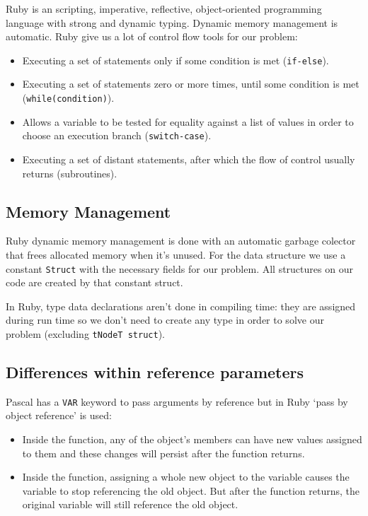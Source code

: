 \documentclass[11pt]{scrartcl} %
\begin{document}
Ruby is an scripting, imperative, reflective, object-oriented programming language with strong and dynamic typing. Dynamic memory management is automatic. Ruby give us a lot of control flow tools for our problem:

\begin{itemize}  
\item Executing a set of statements only if some condition is met (\texttt{if-else}).
\item Executing a set of statements zero or more times, until some condition is met (\texttt{while(condition)}). 
\item Allows a variable to be tested for equality against a list of values in order to choose an execution branch (\texttt{switch-case}).
\item Executing a set of distant statements, after which the flow of control usually returns (subroutines).
\end{itemize}

\subsection*{Memory Management}

Ruby dynamic memory management is done with an automatic garbage colector that frees allocated memory when it's unused. For the data structure we use a constant \texttt{Struct} with the necessary fields for our problem. All structures on our code are created by that constant struct.

In Ruby, type data declarations aren't done in compiling time: they are assigned during run time so we don't need to create any type in order to solve our problem (excluding \texttt{tNodeT struct}).

\subsection*{Differences within reference parameters}

Pascal has a \texttt{VAR} keyword to pass arguments by reference but in Ruby `pass by object reference' is used:

 \begin{itemize}
\item Inside the function, any of the object's members can have new values assigned to them and these changes will persist after the function returns.
\item Inside the function, assigning a whole new object to the variable causes the variable to stop referencing the old object. But after the function returns, the original variable will still reference the old object.
\end{itemize}
\end{document}
